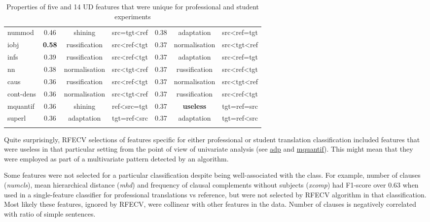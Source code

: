 \begin{longtable}[H]{p{1.84cm}|ccc||ccc}
	nummod        & 0.46 & shining       & src=tgt\textless{}ref           & 0.38 & adaptation    & src\textless{}ref=tgt           \\
	iobj          & \textbf{0.58} & russification & src\textless{}ref\textless{}tgt & 0.37 & normalisation & src\textless{}tgt\textless{}ref \\
	infs          & 0.39 & russification & src\textless{}ref\textless{}tgt & 0.37 & adaptation    & src\textless{}ref=tgt           \\
	nn            & 0.38 & normalisation & src\textless{}tgt\textless{}ref & 0.37 & russification & src\textless{}ref\textless{}tgt \\
	caus          & 0.36 & russification & src\textless{}ref\textless{}tgt & 0.37 & normalisation & src\textless{}tgt\textless{}ref \\
	cont-dens & 0.36 & normalisation & src\textless{}tgt\textless{}ref & 0.37 & russification & src\textless{}ref\textless{}tgt \\
	mquantif      & 0.36 & shining       & ref\textless{}src=tgt           & 0.37 & \textbf{useless}       & tgt=ref=src                     \\
	superl        & 0.36 & adaptation    & tgt=ref\textless{}src           & 0.37 & adaptation    & tgt=ref\textless{}src  \\
	\bottomrule
	\caption{\label{tab:spec_rfecv_feats}Properties of five and 14 UD features that were unique for professional and student experiments}\\
\end{longtable}	

Quite surprisingly, RFECV selections of features specific for either professional or student translation classification included features that were useless in that particular setting from the point of view of univariate analysis (see \hyperlink{ft:adp}{adp} and \hyperlink{ft:mquantif}{mquantif}). This might mean that they were employed as part of a multivariate pattern detected by an algorithm.

Some features were not selected for a particular classification despite being well-associated with the class. For example, number of clauses (\textit{numcls}), mean hierarchical distance (\textit{mhd}) and frequency of clausal complements without subjects (\textit{xcomp}) had F1-score over 0.63 when used in a single-feature classifier for professional translations vs reference, but were not selected by RFECV algorithm in that classification. Most likely these features, ignored by RFECV, were collinear with other features in the data. Number of clauses is negatively correlated with ratio of simple sentences. 

